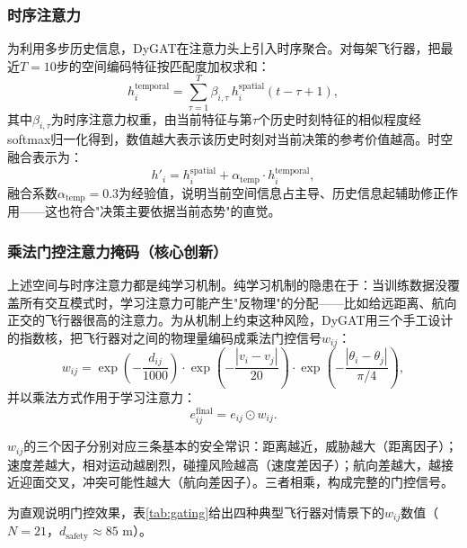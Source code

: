 \documentclass[12pt,a4paper,UTF8]{ctexart}
\begin{document}
\subsubsection{时序注意力}

为利用多步历史信息，DyGAT在注意力头上引入时序聚合。对每架飞行器，把最近$T=10$步的空间编码特征按匹配度加权求和：
\begin{equation}
    h_i^{\text{temporal}} = \sum_{\tau=1}^{T} \beta_{i,\tau}\, h_i^{\text{spatial}}(t-\tau+1),
    \label{eq:temporal_attn}
\end{equation}
其中$\beta_{i,\tau}$为时序注意力权重，由当前特征与第$\tau$个历史时刻特征的相似程度经softmax归一化得到，数值越大表示该历史时刻对当前决策的参考价值越高。时空融合表示为：
\begin{equation}
    h'_i = h_i^{\text{spatial}} + \alpha_{\text{temp}} \cdot h_i^{\text{temporal}},
    \label{eq:temporal_fusion}
\end{equation}
融合系数$\alpha_{\text{temp}}=0.3$为经验值，说明当前空间信息占主导、历史信息起辅助修正作用——这也符合"决策主要依据当前态势"的直觉。

\subsubsection{乘法门控注意力掩码（核心创新）}

上述空间与时序注意力都是纯学习机制。纯学习机制的隐患在于：当训练数据没覆盖所有交互模式时，学习注意力可能产生"反物理"的分配——比如给远距离、航向正交的飞行器很高的注意力。为从机制上约束这种风险，DyGAT用三个手工设计的指数核，把飞行器对之间的物理量编码成乘法门控信号$w_{ij}$：
\begin{equation}
    w_{ij} = \exp\!\left(-\frac{d_{ij}}{1000}\right) \cdot \exp\!\left(-\frac{|v_i - v_j|}{20}\right) \cdot \exp\!\left(-\frac{|\theta_i - \theta_j|}{\pi/4}\right),
    \label{eq:gating_w}
\end{equation}
并以乘法方式作用于学习注意力：
\begin{equation}
    e_{ij}^{\text{final}} = e_{ij} \odot w_{ij}.
    \label{eq:gating_final}
\end{equation}

$w_{ij}$的三个因子分别对应三条基本的安全常识：距离越近，威胁越大（距离因子）；速度差越大，相对运动越剧烈，碰撞风险越高（速度差因子）；航向差越大，越接近迎面交叉，冲突可能性越大（航向差因子）。三者相乘，构成完整的门控信号。

为直观说明门控效果，表\ref{tab:gating}给出四种典型飞行器对情景下的$w_{ij}$数值（$N=21$，$d_{\text{safety}}\approx85$ m）。
\end{document}
